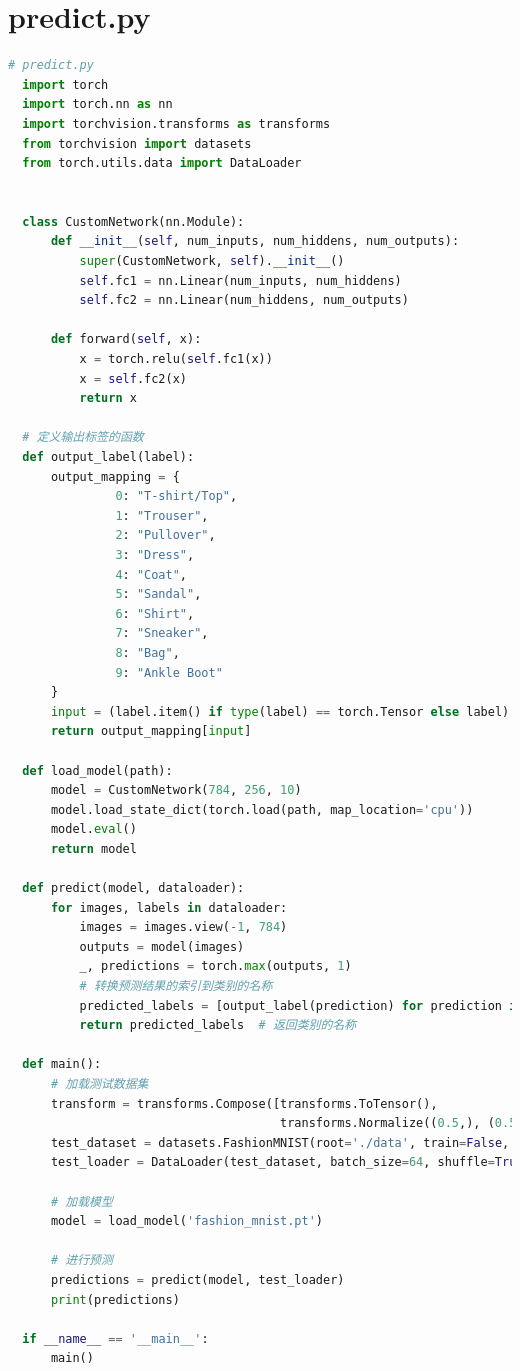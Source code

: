 \documentclass[12pt]{article}
\begin{document}
\section{predict.py}

\begin{lstlisting}[language=Python]
  # predict.py
  import torch
  import torch.nn as nn
  import torchvision.transforms as transforms
  from torchvision import datasets
  from torch.utils.data import DataLoader
  
  
  class CustomNetwork(nn.Module):
      def __init__(self, num_inputs, num_hiddens, num_outputs):
          super(CustomNetwork, self).__init__()
          self.fc1 = nn.Linear(num_inputs, num_hiddens)
          self.fc2 = nn.Linear(num_hiddens, num_outputs)
  
      def forward(self, x):
          x = torch.relu(self.fc1(x))
          x = self.fc2(x)
          return x
  
  # 定义输出标签的函数
  def output_label(label):
      output_mapping = {
               0: "T-shirt/Top",
               1: "Trouser",
               2: "Pullover",
               3: "Dress",
               4: "Coat", 
               5: "Sandal", 
               6: "Shirt",
               7: "Sneaker",
               8: "Bag",
               9: "Ankle Boot"
      }
      input = (label.item() if type(label) == torch.Tensor else label)
      return output_mapping[input]
  
  def load_model(path):
      model = CustomNetwork(784, 256, 10)
      model.load_state_dict(torch.load(path, map_location='cpu'))
      model.eval()
      return model
  
  def predict(model, dataloader):
      for images, labels in dataloader:
          images = images.view(-1, 784)
          outputs = model(images)
          _, predictions = torch.max(outputs, 1)
          # 转换预测结果的索引到类别的名称
          predicted_labels = [output_label(prediction) for prediction in predictions]
          return predicted_labels  # 返回类别的名称
  
  def main():
      # 加载测试数据集
      transform = transforms.Compose([transforms.ToTensor(),
                                      transforms.Normalize((0.5,), (0.5,))])
      test_dataset = datasets.FashionMNIST(root='./data', train=False, transform=transform, download=True)
      test_loader = DataLoader(test_dataset, batch_size=64, shuffle=True)
  
      # 加载模型
      model = load_model('fashion_mnist.pt')
  
      # 进行预测
      predictions = predict(model, test_loader)
      print(predictions)
  
  if __name__ == '__main__':
      main()
  

\end{lstlisting}
\end{document}
